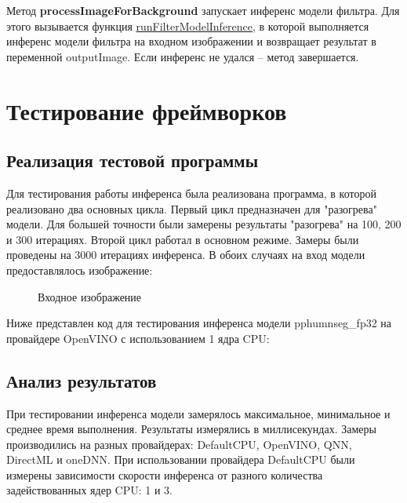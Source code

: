 \documentclass[a4paper,14pt]{extreport}
\begin{document}
        Метод \hypertarget{imageForBackground}{}\textbf{processImageForBackground} запускает инференс модели фильтра. Для этого вызывается функция \hyperlink{runFilter}{runFilterModelInference}, в которой выполняется инференс модели фильтра на входном изображении и возвращает результат в переменной outputImage. Если инференс не удался -- метод завершается. 
    
    \chapter{Тестирование фреймворков}
        \section{Реализация тестовой программы}
        Для тестирования работы инференса была реализована программа, в которой реализовано два основных цикла. Первый цикл предназначен для "разогрева" модели. Для большей точности были замерены результаты "разогрева" на 100, 200 и 300 итерациях. Второй цикл работал в основном режиме. Замеры были проведены на 3000 итерациях инференса. В обоих случаях на вход модели предоставлялось изображение:
        \begin{figure}[h]
            \caption{Входное изображение}
            \label{ris:input}
        \end{figure}
        
        Ниже представлен код для тестирования инференса модели pphumnseg\_fp32 на провайдере OpenVINO с использованием 1 ядра CPU:
        

        \section{Анализ результатов}
        При тестировании инференса модели замерялось максимальное, минимальное и среднее время выполнения. Результаты измерялись в миллисекундах. Замеры производились на разных провайдерах: DefaultCPU, OpenVINO, QNN, DirectML и oneDNN. При использовании провайдера DefaultCPU были измерены зависимости скорости инференса от разного количества задействованных ядер CPU: 1 и 3.
\end{document}
